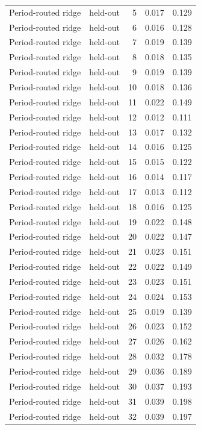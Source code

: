 \begin{tabular}{llrrr}
Period-routed ridge & held-out & 5 & 0.017 & 0.129 \\
Period-routed ridge & held-out & 6 & 0.016 & 0.128 \\
Period-routed ridge & held-out & 7 & 0.019 & 0.139 \\
Period-routed ridge & held-out & 8 & 0.018 & 0.135 \\
Period-routed ridge & held-out & 9 & 0.019 & 0.139 \\
Period-routed ridge & held-out & 10 & 0.018 & 0.136 \\
Period-routed ridge & held-out & 11 & 0.022 & 0.149 \\
Period-routed ridge & held-out & 12 & 0.012 & 0.111 \\
Period-routed ridge & held-out & 13 & 0.017 & 0.132 \\
Period-routed ridge & held-out & 14 & 0.016 & 0.125 \\
Period-routed ridge & held-out & 15 & 0.015 & 0.122 \\
Period-routed ridge & held-out & 16 & 0.014 & 0.117 \\
Period-routed ridge & held-out & 17 & 0.013 & 0.112 \\
Period-routed ridge & held-out & 18 & 0.016 & 0.125 \\
Period-routed ridge & held-out & 19 & 0.022 & 0.148 \\
Period-routed ridge & held-out & 20 & 0.022 & 0.147 \\
Period-routed ridge & held-out & 21 & 0.023 & 0.151 \\
Period-routed ridge & held-out & 22 & 0.022 & 0.149 \\
Period-routed ridge & held-out & 23 & 0.023 & 0.151 \\
Period-routed ridge & held-out & 24 & 0.024 & 0.153 \\
Period-routed ridge & held-out & 25 & 0.019 & 0.139 \\
Period-routed ridge & held-out & 26 & 0.023 & 0.152 \\
Period-routed ridge & held-out & 27 & 0.026 & 0.162 \\
Period-routed ridge & held-out & 28 & 0.032 & 0.178 \\
Period-routed ridge & held-out & 29 & 0.036 & 0.189 \\
Period-routed ridge & held-out & 30 & 0.037 & 0.193 \\
Period-routed ridge & held-out & 31 & 0.039 & 0.198 \\
Period-routed ridge & held-out & 32 & 0.039 & 0.197 \\

\end{tabular}
